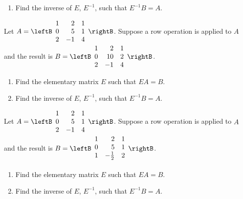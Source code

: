 \begin{enumialphparenastyle}
\begin{ex}
\begin{enumerate}
\item Find the inverse of $E$, $E^{-1}$, such that $E^{-1}B = A$.
\end{enumerate}
\end{ex}

\begin{ex} 
Let $A = \leftB \begin{array}{rrr}
1 & 2 & 1  \\
0 & 5 & 1 \\
2 & -1 & 4
\end{array}\rightB$. Suppose a row operation is applied to $A$ and the result is $B = \leftB \begin{array}{rrr}
1 & 2 & 1\\
0 & 10 & 2 \\
2 & -1 & 4  
\end{array}\rightB$. 
\begin{enumerate}
\item Find the elementary matrix $E$ such that $EA = B$. 

\item Find the inverse of $E$, $E^{-1}$, such that $E^{-1}B = A$.
\end{enumerate}
\end{ex}


\begin{ex} 
Let $A = \leftB \begin{array}{rrr}
1 & 2 & 1  \\
0 & 5 & 1 \\
2 & -1 & 4
\end{array}\rightB$. Suppose a row operation is applied to $A$ and the result is $B = \leftB \begin{array}{rrr}
1 & 2 & 1\\
0 & 5 & 1 \\
1 & -\vspace{0.05in}\frac{1}{2} & 2  
\end{array}\rightB$. 
\begin{enumerate}
\item Find the elementary matrix $E$ such that $EA = B$. 

\item Find the inverse of $E$, $E^{-1}$, such that $E^{-1}B = A$.
\end{enumerate}
\end{ex}



\end{enumialphparenastyle}
